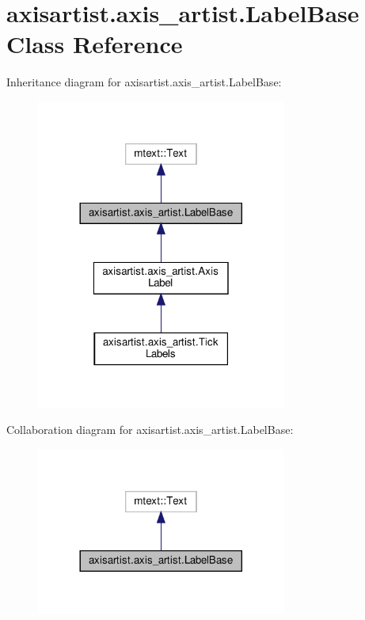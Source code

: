 \hypertarget{classaxisartist_1_1axis__artist_1_1LabelBase}{}\section{axisartist.\+axis\+\_\+artist.\+Label\+Base Class Reference}
\label{classaxisartist_1_1axis__artist_1_1LabelBase}


Inheritance diagram for axisartist.\+axis\+\_\+artist.\+Label\+Base\+:
\nopagebreak
\begin{figure}[H]
\begin{center}
\leavevmode
\includegraphics[width=233pt]{classaxisartist_1_1axis__artist_1_1LabelBase__inherit__graph}
\end{center}
\end{figure}


Collaboration diagram for axisartist.\+axis\+\_\+artist.\+Label\+Base\+:
\nopagebreak
\begin{figure}[H]
\begin{center}
\leavevmode
\includegraphics[width=233pt]{classaxisartist_1_1axis__artist_1_1LabelBase__coll__graph}
\end{center}
\end{figure}
